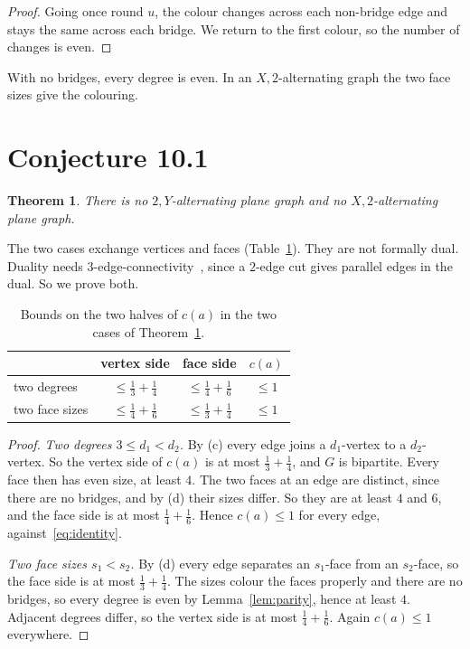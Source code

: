 \documentclass{amsart}
\theoremstyle{plain}
\newtheorem{theorem}{Theorem}[section]
\theoremstyle{definition}
\theoremstyle{remark}
\begin{document}
\begin{proof}
Going once round $u$, the colour changes across each non-bridge edge and stays
the same across each bridge. We return to the first colour, so the number of
changes is even.
\end{proof}

With no bridges, every degree is even. In an $X,2$-alternating graph the two face
sizes give the colouring.

\section{Conjecture 10.1}\label{sec:101}

\begin{theorem}\label{thm:101}
There is no $2,Y$-alternating plane graph and no $X,2$-alternating plane graph.
\end{theorem}

The two cases exchange vertices and faces (Table~\ref{tab:budget}). They are not
formally dual. Duality needs $3$-edge-connectivity~\cite[Lemma~2.2]{AHSSV2015},
since a $2$-edge cut gives parallel edges in the dual. So we prove both.

\begin{table}[ht]
\centering
\begin{tabular}{lccc}
\toprule
 & vertex side & face side & $c(a)$ \\
\midrule
two degrees
 & $\le \tfrac13+\tfrac14$
 & $\le \tfrac14+\tfrac16$
 & $\le 1$ \\[2pt]
two face sizes
 & $\le \tfrac14+\tfrac16$
 & $\le \tfrac13+\tfrac14$
 & $\le 1$ \\
\bottomrule
\end{tabular}
\caption{Bounds on the two halves of $c(a)$ in the two cases of
Theorem~\ref{thm:101}.}\label{tab:budget}
\end{table}

\begin{proof}
\emph{Two degrees $3 \le d_1 < d_2$.} By (c) every edge joins a $d_1$-vertex to
a $d_2$-vertex. So the vertex side of $c(a)$ is at most $\frac13+\frac14$, and
$G$ is bipartite. Every face then has even size, at least $4$. The two faces at
an edge are distinct, since there are no bridges, and by (d) their sizes differ.
So they are at least $4$ and $6$, and the face side is at most
$\frac14+\frac16$. Hence $c(a) \le 1$ for every edge, against~\eqref{eq:identity}.

\smallskip
\emph{Two face sizes $s_1 < s_2$.} By (d) every edge separates an $s_1$-face
from an $s_2$-face, so the face side is at most $\frac13+\frac14$. The sizes
colour the faces properly and there are no bridges, so every degree is even by
Lemma~\ref{lem:parity}, hence at least $4$. Adjacent degrees differ, so the
vertex side is at most $\frac14+\frac16$. Again $c(a) \le 1$ everywhere.
\end{proof}
\end{document}
